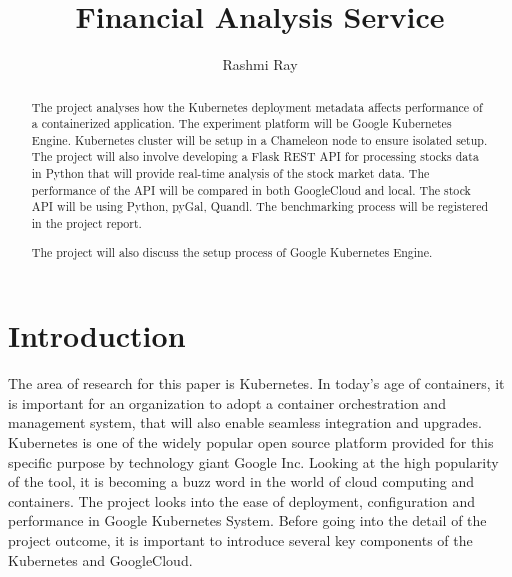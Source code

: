 
\title{Financial Analysis Service}

\author{Rashmi Ray}

\renewcommand{\shortauthors}{Rashmi Ray}

\begin{abstract}
  The project analyses how the Kubernetes deployment metadata affects
  performance of a containerized application. The experiment platform will be
  Google Kubernetes Engine. Kubernetes cluster will be setup in a Chameleon
  node to ensure isolated setup. The project will also involve developing a
  Flask REST API for processing stocks data in Python that will provide
  real-time analysis of the stock market data. The performance of the API will
  be compared in both GoogleCloud and local. The stock API will be using
  Python, pyGal, Quandl. The benchmarking process will be registered in the
  project report. 
  
  The project will also discuss the setup process of Google Kubernetes Engine.
   

\end{abstract}



\maketitle

\section{Introduction}

The area of research for this paper is Kubernetes. In today's age of
containers, it is important for an organization to adopt a container
orchestration and management system, that will also enable seamless
integration and upgrades. Kubernetes is one of the widely popular open source
platform provided for this specific purpose by technology giant Google Inc.
Looking at the high popularity of the tool, it is becoming a buzz word in the
world of cloud computing and containers. The project looks into the ease of
deployment, configuration and performance in Google Kubernetes System. Before
going into the detail of the project outcome, it is important to introduce
several key components of the Kubernetes and GoogleCloud.


